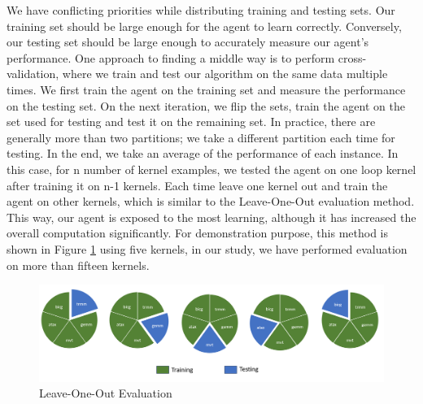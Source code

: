 \documentclass[logo,msc]{infthesis}           %
\begin{document}
We have conflicting priorities while distributing training and testing sets. Our training set should be large enough for the agent to learn correctly. Conversely, our testing set should be large enough to accurately measure our agent's performance. One approach to finding a middle way is to perform cross-validation, where we train and test our algorithm on the same data multiple times. We first train the agent on the training set and measure the performance on the testing set. On the next iteration, we flip the sets, train the agent on the set used for testing and test it on the remaining set. In practice, there are generally more than two partitions; we take a different partition each time for testing. In the end, we take an average of the performance of each instance. In this case, for n number of kernel examples, we tested the agent on one loop kernel after training it on n-1 kernels. Each time leave one kernel out and train the agent on other kernels, which is similar to the Leave-One-Out evaluation method\cite{inbook}. This way, our agent is exposed to the most learning, although it has increased the overall computation significantly. For demonstration purpose, this method is shown in Figure \ref{fig:leave_one_out} using five kernels, in our study, we have performed evaluation on more than fifteen kernels.

\begin{figure}[htbp]
  \centering
  \includegraphics[width=\textwidth]{Images/Leave_One_Out.png}   
  \caption{Leave-One-Out Evaluation}
  \label{fig:leave_one_out} 
\end{figure}
\end{document}
